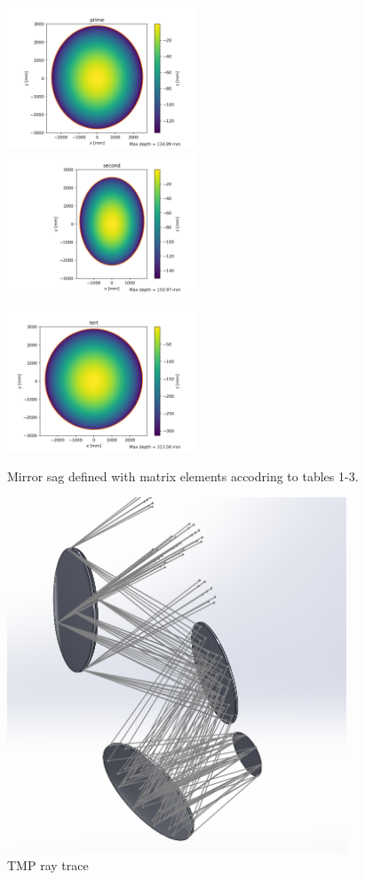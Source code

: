 \documentclass[12pt, letterpaper, twoside]{article}
\begin{document}
\begin{figure}
	\centering
	\includegraphics[width=0.5\textwidth]{./prime.png}\hfill
	\includegraphics[width=0.5\textwidth]{./second.png}
	
	\includegraphics[width=0.5\textwidth]{./tert.png}
	\label{fig:mirrorshape}
	\caption{Mirror sag defined with matrix elements accodring to tables 1-3.}
\end{figure}

\begin{figure}
	\centering
	\includegraphics[width=0.9\textwidth]{mirror_fp_rays.PNG}
	\caption{TMP ray trace}
\end{figure}
\end{document}
